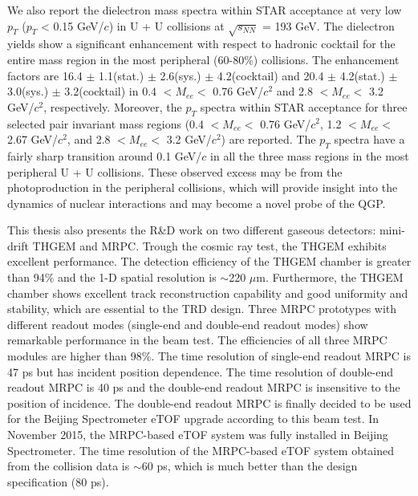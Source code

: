 We also report the dielectron mass spectra within STAR acceptance at very low $p_{T}$ ($p_{T}$ < 0.15 GeV/$c$) in U + U collisions at $\sqrt{s_{NN}}$ = 193 GeV. The dielectron yields show a significant enhancement with respect to hadronic cocktail for the entire mass region in the most peripheral (60-80\%) collisions. The enhancement factors are 16.4 $\pm$ 1.1(stat.) $\pm$ 2.6(sys.) $\pm$ 4.2(cocktail) and 20.4 $\pm$ 4.2(stat.) $\pm$ 3.0(sys.) $\pm$ 3.2(cocktail) in 0.4 $<M_{ee}<$ 0.76 GeV/$c^{2}$ and 2.8 $<M_{ee}<$ 3.2 GeV/$c^{2}$, respectively. Moreover, the $p_{T}$ spectra within STAR acceptance for three selected pair invariant mass regions (0.4 $<M_{ee}<$ 0.76 GeV/$c^{2}$, 1.2 $<M_{ee}<$ 2.67 GeV/$c^{2}$, and 2.8 $<M_{ee}<$ 3.2 GeV/$c^{2}$) are reported. The $p_{T}$ spectra have a fairly sharp transition around 0.1 GeV/$c$ in all the three mass regions in the most peripheral U + U collisions. These observed excess may be from the photoproduction in the peripheral collisions, which will provide insight into the dynamics of nuclear interactions and may become a novel probe of the QGP.

This thesis also presents the R\&D work on two different gaseous detectors: mini-drift THGEM and MRPC. Trough the cosmic ray test, the THGEM exhibits excellent performance. The detection efficiency of the THGEM chamber is greater than 94$\%$ and the 1-D spatial resolution is $\sim$220 $\mu$m. Furthermore, the THGEM chamber shows excellent track reconstruction capability and good uniformity and stability, which are essential to the TRD design. Three MRPC prototypes with different readout modes (single-end and double-end readout modes) show remarkable performance in the beam test. The efficiencies of all three MRPC modules are higher than 98\%. The time resolution of single-end readout MRPC is 47 ps but has incident position dependence. The time resolution of double-end readout MRPC is 40 ps and the double-end readout MRPC is insensitive to the position of incidence. The double-end readout MRPC is finally decided to be used for the Beijing Spectrometer eTOF upgrade according to this beam test. In November 2015, the MRPC-based eTOF system was fully installed in Beijing Spectrometer. The time resolution of the MRPC-based eTOF system obtained from the collision data is $\sim$60 ps, which is much better than the design specification (80 ps).

